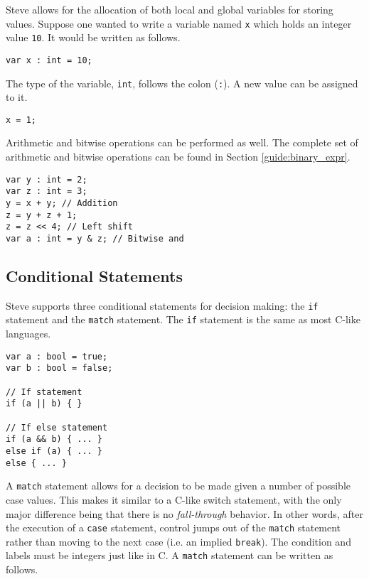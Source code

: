Steve allows for the allocation of both local and global variables for storing values. Suppose one wanted to write a variable named \texttt{x} which holds an
integer value \texttt{10}. It would be written as follows.

\begin{codepage}
\begin{lstlisting}
var x : int = 10;
\end{lstlisting}
\end{codepage}

The type of the variable, \texttt{int}, follows the colon
(\texttt{:}). A new value can be assigned to it.

\begin{codepage}
\begin{lstlisting}
x = 1;
\end{lstlisting}
\end{codepage}

Arithmetic and bitwise operations can be performed as well. The complete set of
arithmetic and bitwise operations can be found in Section
\ref{guide:binary_expr}.

\begin{codepage}
\begin{lstlisting}
var y : int = 2;
var z : int = 3;
y = x + y; // Addition
z = y + z + 1;
z = z << 4; // Left shift
var a : int = y & z; // Bitwise and
\end{lstlisting}
\end{codepage}


\subsection{Conditional Statements} \label{tut:condition}

Steve supports three conditional statements for decision making: the \texttt{if} statement and the \texttt{match} statement. The \texttt{if} statement is the same as most C-like languages.

\begin{codepage}
\begin{lstlisting}
var a : bool = true;
var b : bool = false;

// If statement
if (a || b) { }

// If else statement
if (a && b) { ... }
else if (a) { ... }
else { ... }
\end{lstlisting}
\end{codepage}

A \texttt{match} statement allows for a decision to be made given a number of possible
case values. This makes it similar to a C-like switch statement, with the only
major difference being that there is no \textit{fall-through} behavior. In other
words, after the execution of a \texttt{case} statement, control jumps out of the \texttt{match}
statement rather than moving to the next case (i.e. an implied \texttt{break}). The
condition and labels must be integers just like in C. A \texttt{match} statement can be
written as follows.

